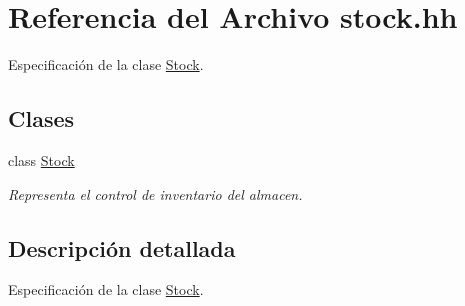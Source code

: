 \hypertarget{stock_8hh}{}\section{Referencia del Archivo stock.\+hh}
\label{stock_8hh}


Especificación de la clase \mbox{\hyperlink{class_stock}{Stock}}.  


\subsection*{Clases}
\begin{DoxyCompactItemize}
\item 
class \mbox{\hyperlink{class_stock}{Stock}}
\begin{DoxyCompactList}\small\item\em Representa el control de inventario del almacen. \end{DoxyCompactList}\end{DoxyCompactItemize}


\subsection{Descripción detallada}
Especificación de la clase \mbox{\hyperlink{class_stock}{Stock}}. 

